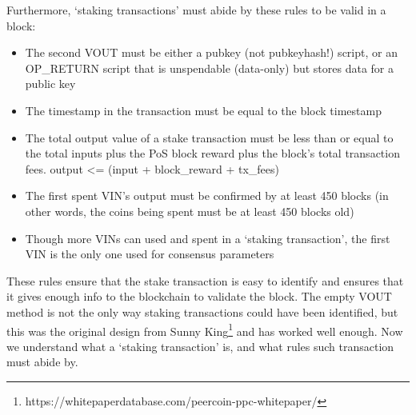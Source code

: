 Furthermore, ‘staking transactions’ must abide by these rules to be valid
in a block:
\begin{itemize}
	\item The second VOUT must be either a pubkey (not pubkeyhash!) script, 
	or an OP\_RETURN script that is unspendable (data-only) but stores data 
	for a public key
	\item The timestamp in the transaction must be equal to the block timestamp
	\item The total output value of a stake transaction must be less than or 
	equal to the total inputs plus the PoS block reward plus the block's 
	total transaction fees. output <= (input + block\_reward + tx\_fees)
	\item The first spent VIN's output must be confirmed by at least 450 
	blocks (in other words, the coins being spent must be at least 450 
	blocks old)
	\item Though more VINs can used and spent in a ‘staking transaction’, 
	the first VIN is the only one used for consensus parameters
\end{itemize}



These rules ensure that the stake transaction is easy to identify and
ensures that it gives enough info to the blockchain to validate the block.
The empty VOUT method is not the only way staking transactions could have
been identified, but this was the original design from Sunny
King\footnote{https://whitepaperdatabase.com/peercoin-ppc-whitepaper/}
and has worked well enough. Now we understand what a ‘staking transaction’
is, and what rules such transaction must abide by.



